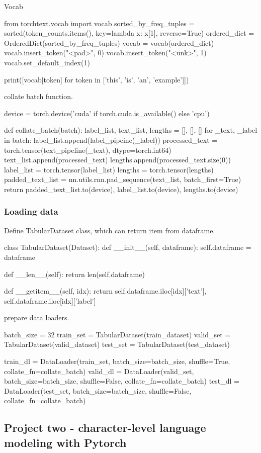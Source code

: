 Vocab
\begin{pythoncode}
from torchtext.vocab import vocab
sorted_by_freq_tuples = sorted(token_counts.items(), key=lambda x: x[1], reverse=True)
ordered_dict = OrderedDict(sorted_by_freq_tuples)
vocab = vocab(ordered_dict)
vocab.insert_token("<pad>", 0)
vocab.insert_token("<unk>", 1)
vocab.set_default_index(1)

print([vocab[token] for token in ['this', 'is', 'an', 'example']])
\end{pythoncode}

collate batch function.
\begin{pythoncode}
device = torch.device('cuda' if torch.cuda.is_available() else 'cpu')

def collate_batch(batch):
    label_list, text_list, lengths = [], [], []
    for _text, _label in batch:
        label_list.append(label_pipeine(_label))
        processed_text = torch.tensor(text_pipeline(_text), dtype=torch.int64)
        text_list.append(processed_text)
        lengths.append(processed_text.size(0))
    label_list = torch.tensor(label_list)
    lengths = torch.tensor(lengths)
    padded_text_list = nn.utils.rnn.pad_sequence(text_list, batch_first=True)
    return padded_text_list.to(device), label_list.to(device), lengths.to(device)
\end{pythoncode}

\subsubsection{Loading data}
Define TabularDataset class, which can return item from dataframe.
\begin{pythoncode}
class TabularDataset(Dataset):
    def __init__(self, dataframe):
        self.dataframe = dataframe
    
    def __len__(self):
        return len(self.dataframe)
    
    def __getitem__(self, idx):
        return self.dataframe.iloc[idx]['text'], self.dataframe.iloc[idx]['label']
\end{pythoncode}

prepare data loaders.
\begin{pythoncode}
batch_size = 32
train_set = TabularDataset(train_dataset)
valid_set = TabularDataset(valid_dataset)
test_set = TabularDataset(test_dataset)

train_dl = DataLoader(train_set, batch_size=batch_size, shuffle=True, collate_fn=collate_batch)
valid_dl = DataLoader(valid_set, batch_size=batch_size, shuffle=False, collate_fn=collate_batch)
test_dl = DataLoader(test_set, batch_size=batch_size, shuffle=False, collate_fn=collate_batch)
\end{pythoncode}

\subsection{Project two - character-level language modeling with Pytorch}